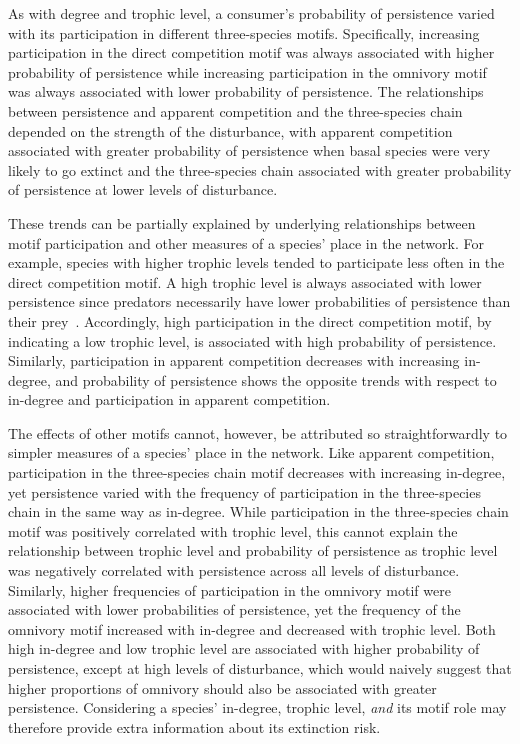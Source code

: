 \documentclass[12pt]{article}
\begin{document}
\begin{spacing}{2.0}
    
    As with degree and trophic level, a consumer's probability of persistence varied with its participation in different three-species motifs.
    Specifically, increasing participation in the direct competition motif was always associated with higher probability of persistence while increasing participation in the omnivory motif was always associated with lower probability of persistence.
    The relationships between persistence and apparent competition and the three-species chain depended on the strength of the disturbance, with apparent competition associated with greater probability of persistence when basal species were very likely to go extinct and the three-species chain associated with greater probability of persistence at lower levels of disturbance. 
    

    These trends can be partially explained by underlying relationships between motif participation and other measures of a species' place in the network.
    For example, species with higher trophic levels tended to participate less often in the direct competition motif.
    A high trophic level is always associated with lower persistence since predators necessarily have lower probabilities of persistence than their prey~\citep{Eklof2013}.
    Accordingly, high participation in the direct competition motif, by indicating a low trophic level, is associated with high probability of persistence.
    Similarly, participation in apparent competition decreases with increasing in-degree, and probability of persistence shows the opposite trends with respect to in-degree and participation in apparent competition.

    
    The effects of other motifs cannot, however, be attributed so straightforwardly to simpler measures of a species' place in the network.
    Like apparent competition, participation in the three-species chain motif decreases with increasing in-degree, yet persistence varied with the frequency of participation in the three-species chain in the same way as in-degree.
    While participation in the three-species chain motif was positively correlated with trophic level, this cannot explain the relationship between trophic level and probability of persistence as trophic level was negatively correlated with persistence across all levels of disturbance.
    Similarly, higher frequencies of participation in the omnivory motif were associated with lower probabilities of persistence, yet the frequency of the omnivory motif increased with in-degree and decreased with trophic level.
    Both high in-degree and low trophic level are associated with higher probability of persistence, except at high levels of disturbance, which would naively suggest that higher proportions of omnivory should also be associated with greater persistence. 
    Considering a species' in-degree, trophic level, \emph{and} its motif role may therefore provide extra information about its extinction risk.
    

\end{spacing}
\end{document}
